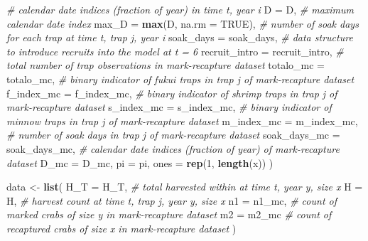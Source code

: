 \documentclass[
]{article}
\newenvironment{Shaded}{\begin{snugshade}}{\end{snugshade}}
\newcommand{\AttributeTok}[1]{\textcolor[rgb]{0.13,0.29,0.53}{#1}}
\newcommand{\CommentTok}[1]{\textcolor[rgb]{0.56,0.35,0.01}{\textit{#1}}}
\newcommand{\ConstantTok}[1]{\textcolor[rgb]{0.56,0.35,0.01}{#1}}
\newcommand{\DecValTok}[1]{\textcolor[rgb]{0.00,0.00,0.81}{#1}}
\newcommand{\FunctionTok}[1]{\textcolor[rgb]{0.13,0.29,0.53}{\textbf{#1}}}
\newcommand{\NormalTok}[1]{#1}
\newcommand{\OtherTok}[1]{\textcolor[rgb]{0.56,0.35,0.01}{#1}}
\begin{document}
\begin{Shaded}
\begin{Highlighting}[]
  \CommentTok{\# calendar date indices (fraction of year) in time t, year i}
  \AttributeTok{D =}\NormalTok{ D,}
  \CommentTok{\# maximum calendar date index}
  \AttributeTok{max\_D =} \FunctionTok{max}\NormalTok{(D, }\AttributeTok{na.rm =} \ConstantTok{TRUE}\NormalTok{),}
  \CommentTok{\# number of soak days for each trap at time t, trap j, year i}
  \AttributeTok{soak\_days =}\NormalTok{ soak\_days,}
  \CommentTok{\# data structure to introduce recruits into the model at t = 6}
  \AttributeTok{recruit\_intro =}\NormalTok{ recruit\_intro,}
  \CommentTok{\# total number of trap observations in mark{-}recapture dataset}
  \AttributeTok{totalo\_mc =}\NormalTok{ totalo\_mc,}
  \CommentTok{\# binary indicator of fukui traps in trap j of mark{-}recapture dataset}
  \AttributeTok{f\_index\_mc =}\NormalTok{ f\_index\_mc,}
  \CommentTok{\# binary indicator of shrimp traps in trap j of mark{-}recapture dataset}
  \AttributeTok{s\_index\_mc =}\NormalTok{ s\_index\_mc,}
  \CommentTok{\# binary indicator of minnow traps in trap j of mark{-}recapture dataset}
  \AttributeTok{m\_index\_mc =}\NormalTok{ m\_index\_mc,}
  \CommentTok{\# number of soak days in trap j of mark{-}recapture dataset}
  \AttributeTok{soak\_days\_mc =}\NormalTok{ soak\_days\_mc,}
  \CommentTok{\# calendar date indices (fraction of year) of mark{-}recapture dataset}
  \AttributeTok{D\_mc =}\NormalTok{ D\_mc,}
  \AttributeTok{pi =}\NormalTok{ pi,}
  \AttributeTok{ones =} \FunctionTok{rep}\NormalTok{(}\DecValTok{1}\NormalTok{, }\FunctionTok{length}\NormalTok{(x))}
\NormalTok{)}

\NormalTok{data }\OtherTok{\textless{}{-}} \FunctionTok{list}\NormalTok{(}
  \AttributeTok{H\_T =}\NormalTok{ H\_T, }\CommentTok{\# total harvested within at time t, year y, size x}
  \AttributeTok{H =}\NormalTok{ H, }\CommentTok{\# harvest count at time t, trap j, year y, size x}
  \AttributeTok{n1 =}\NormalTok{ n1\_mc, }\CommentTok{\# count of marked crabs of size y in mark{-}recapture dataset}
  \AttributeTok{m2 =}\NormalTok{ m2\_mc }\CommentTok{\# count of recaptured crabs of size x in mark{-}recapture dataset}
\NormalTok{)}



\end{Highlighting}
\end{Shaded}
\end{document}
